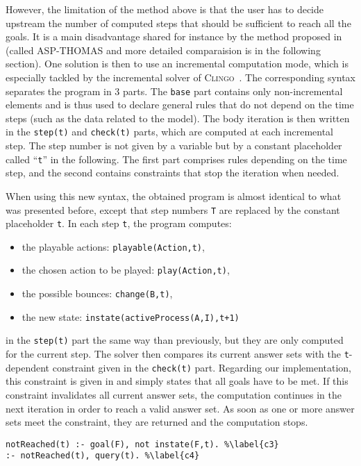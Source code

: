 However, the limitation of the method above is that the user has to decide upstream
the number of computed steps that should be sufficient to reach all the goals.
It is a main disadvantage shared for instance by the method proposed in ~\cite{roccaasp} (called \textsc{ASP-THOMAS} and more detailed comparaision is in the following section).
One solution is then to use an incremental computation mode,
which is especially tackled by the incremental solver of \textsc{Clingo}~\cite{gebser2008user}.
The corresponding syntax separates the program in 3 parts.
The \texttt{base} part contains only non-incremental elements
and is thus used to declare general rules
that do not depend on the time steps (such as the data related to the model).
The body iteration is then written in the
\texttt{step(t)} and \texttt{check(t)} parts,
which are computed at each incremental step. The step number is not given by a variable but by a constant placeholder called ``\texttt{t}'' in the following.
The first part comprises rules depending on the time step,
and the second contains constraints that stop the iteration when needed.

When using this new syntax, the obtained program is almost identical
to what was presented before,
except that step numbers \texttt{T}
are replaced by the constant placeholder \texttt{t}.
In each step \texttt{t}, the program computes:
\begin{itemize}\renewcommand{\labelitemi}{--}
  \item the playable actions: \texttt{playable(Action,t)},
  \item the chosen action to be played: \texttt{play(Action,t)},
  \item the possible bounces: \texttt{change(B,t)},
  \item the new state: \texttt{instate(activeProcess(A,I),t+1)}
\end{itemize}
in the \texttt{step(t)} part
the same way than previously,
but they are only computed for the current step.
The solver then compares its current answer sets with
the \texttt{t}-dependent constraint given in the \texttt{check(t)} part.
Regarding our implementation, this constraint is given in 
and simply states that all goals have to be met.
If this constraint invalidates all current answer sets,
the computation continues in the next iteration in order to reach a valid answer set.
As soon as one or more answer sets meet the constraint,
they are returned and the computation stops.
\begin{lstlisting}
notReached(t) :- goal(F), not instate(F,t). %\label{c3}
:- notReached(t), query(t). %\label{c4}
\end{lstlisting}



